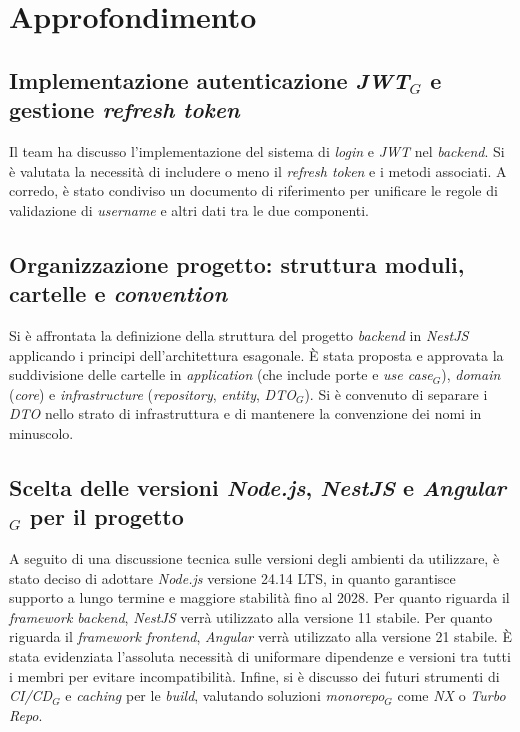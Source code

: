 \documentclass[10pt, letterpaper]{article}
\begin{document}
\section{Approfondimento}

\subsection*{Implementazione autenticazione \textit{JWT$_G$} e gestione \textit{refresh token}}
Il team ha discusso l'implementazione del sistema di \textit{login} e \textit{JWT} nel \textit{backend}.
Si è valutata la necessità di includere o meno il \textit{refresh token} e i metodi associati.
A corredo, è stato condiviso un documento di riferimento per unificare le regole di validazione
di \textit{username} e altri dati tra le due componenti.

\subsection*{Organizzazione progetto: struttura moduli, cartelle e \textit{convention}}
Si è affrontata la definizione della struttura del progetto \textit{backend} in \textit{NestJS} applicando i principi
dell'architettura esagonale. È stata proposta e approvata la suddivisione delle cartelle in \textit{application}
(che include porte e \textit{use case$_G$}), \textit{domain} (\textit{core}) e \textit{infrastructure}
(\textit{repository}, \textit{entity}, \textit{DTO$_G$}).
Si è convenuto di separare i \textit{DTO} nello strato di infrastruttura e di mantenere la convenzione dei nomi in
minuscolo.

\subsection*{Scelta delle versioni \textit{Node.js}, \textit{NestJS} e \textit{Angular$_G$} per il progetto}
A seguito di una discussione tecnica sulle versioni degli ambienti da utilizzare, è stato deciso di adottare
\textit{Node.js} versione 24.14 LTS, in quanto garantisce supporto a lungo termine e maggiore stabilità fino al 2028.
Per quanto riguarda il \textit{framework backend}, \textit{NestJS} verrà utilizzato alla versione 11 stabile.
Per quanto riguarda il \textit{framework frontend}, \textit{Angular} verrà utilizzato alla versione 21 stabile.
È stata evidenziata l'assoluta necessità di uniformare dipendenze e versioni tra tutti i membri per evitare incompatibilità.
Infine, si è discusso dei futuri strumenti di
\textit{CI/CD$_G$} e \textit{caching} per le \textit{build}, valutando soluzioni \textit{monorepo$_G$} come \textit{NX} o
\textit{Turbo Repo}.
\end{document}
